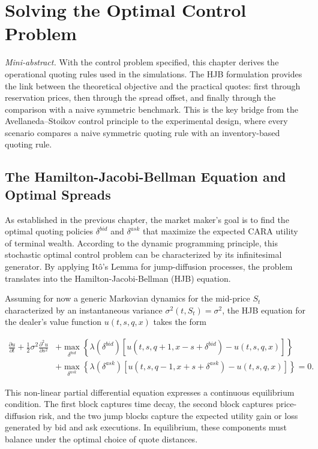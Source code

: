 \documentclass[a4paper,10pt,titlepage,oneside,openany]{book}
\theoremstyle{plain}\newtheorem{theorem}{Theorem}[chapter]
\theoremstyle{definition}\newtheorem{definition}{Definition}[chapter]
\theoremstyle{remark}\newtheorem{remark}{Remark}[chapter]
\newcommand{\miniabstract}[1]{%
\vspace{-2pt}
\begin{tcolorbox}[colback=gray!6,colframe=black!15,boxrule=0.3pt,arc=3pt,left=6pt,right=6pt,top=4pt,bottom=4pt]
\textit{Mini-abstract.} #1
\end{tcolorbox}
\vspace{-4pt}
}
\begin{document}
\chapter{Solving the Optimal Control Problem}
\miniabstract{With the control problem specified, this chapter derives the operational quoting rules used in the simulations. The HJB formulation provides the link between the theoretical objective and the practical quotes: first through reservation prices, then through the spread offset, and finally through the comparison with a naive symmetric benchmark. This is the key bridge from the Avellaneda--Stoikov control principle to the experimental design, where every scenario compares a naive symmetric quoting rule with an inventory-based quoting rule.}

\section{The Hamilton-Jacobi-Bellman Equation and Optimal Spreads}
As established in the previous chapter, the market maker's goal is to find the optimal quoting policies $\delta^{bid}$ and $\delta^{ask}$ that maximize the expected CARA utility of terminal wealth. According to the dynamic programming principle, this stochastic optimal control problem can be characterized by its infinitesimal generator. By applying Itô's Lemma for jump-diffusion processes, the problem translates into the Hamilton-Jacobi-Bellman (HJB) equation.

Assuming for now a generic Markovian dynamics for the mid-price $S_t$ characterized by an instantaneous variance $\sigma^2(t,S_t)=\sigma^2$, the HJB equation for the dealer's value function $u(t,s,q,x)$ takes the form

\begin{align*}
    \frac{\partial u}{\partial t} + \frac{1}{2}\sigma^2 \frac{\partial^2 u}{\partial s^2} &+ \max_{\delta^{bid}} \left\{ \lambda(\delta^{bid}) [u(t, s, q+1, x - s + \delta^{bid}) - u(t,s,q,x)] \right\} \\
    &+ \max_{\delta^{ask}} \left\{ \lambda(\delta^{ask}) [u(t, s, q-1, x + s + \delta^{ask}) - u(t,s,q,x)] \right\} = 0.
\end{align*}

This non-linear partial differential equation expresses a continuous equilibrium condition. The first block captures time decay, the second block captures price-diffusion risk, and the two jump blocks capture the expected utility gain or loss generated by bid and ask executions. In equilibrium, these components must balance under the optimal choice of quote distances. 
\end{document}
